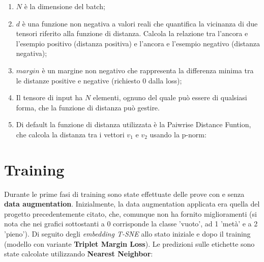 \documentclass[11pt]{article}
\begin{document}
\begin{enumerate}
    \item $N$ è la dimensione del batch;
    \item {$d$ è una funzione non negativa a valori reali che quantifica la vicinanza di due tensori riferito
    alla funzione di distanza. Calcola la relazione tra l'ancora e l'esempio positivo
    (distanza positiva) e l'ancora e l'esempio negativo (distanza negativa);}
    \item {$margin$ 
        è un margine non negativo che rappresenta la differenza minima
        tra le distanze positive e negative (richiesto 0 dalla loss);
    }
    \item Il tensore di input ha $N$ elementi, ognuno del quale può essere di qualsiasi forma, che la funzione di distanza può gestire.

    \item {
        Di default la funzione di distanza utilizzata è la Paiwrise Distance Funtion,
        che calcola la distanza tra i vettori $v_1$ e $v_2$ usando la p-norm:
    }

\end{enumerate}


\pagebreak
\section{Training}

Durante le prime fasi di training sono state effettuate delle prove con e senza \textbf{data augmentation}. Inizialmente, la data augmentation applicata
era quella del progetto precedentemente citato, che, comunque non ha fornito miglioramenti (si nota che nei grafici sottostanti a 0 corrisponde la classe 'vuoto',
ad 1 'metà' e a 2 'pieno'). Di seguito degli \textit{embedding T-SNE} allo stato iniziale e dopo il training (modello con variante \textbf{Triplet Margin Loss}).
Le predizioni sulle etichette sono state calcolate utilizzando \textbf{Nearest Neighbor}:
\end{document}
